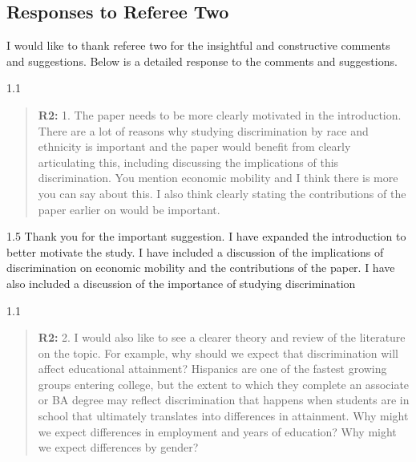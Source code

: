\documentclass[12pt,english]{article}
\newcommand{\rrquote}{1.1}
\newcommand{\rrxspc}{1.5}
\begin{document}
\begin{refsection}
\clearpage
\pagebreak

    \section{Responses to Referee Two}
    I would like to thank referee two for the insightful and constructive comments and suggestions. Below is a detailed response to the comments and suggestions.

    \begin{spacing}{\rrquote}
        \begin{quotation}
        \textbf{R2: } 1. The paper needs to be more clearly motivated in the introduction. There are a lot of reasons why studying discrimination by race and ethnicity is important and the paper would benefit from clearly articulating this, including discussing the implications of this discrimination. You mention economic mobility and I think there is more you can say about this. I also think clearly stating the contributions of the paper earlier on would be important.
        \end{quotation}
        \end{spacing}
        
        \begin{spacing}{\rrxspc}
            Thank you for the important suggestion. I have expanded the introduction to better motivate the study. I have included a discussion of the implications of discrimination on economic mobility and the contributions of the paper. I have also included a discussion of the importance of studying discrimination    
    \end{spacing}

    \begin{spacing}{\rrquote}
        \begin{quotation}
        \textbf{R2: } 2. I would also like to see a clearer theory and review of the literature on the topic. For example, why should we expect that discrimination will affect educational attainment? Hispanics are one of the fastest growing groups entering college, but the extent to which they complete an associate or BA degree may reflect discrimination that happens when students are in school that ultimately translates into differences in attainment. Why might we expect differences in employment and years of education?
        Why might we expect differences by gender?
        \end{quotation}
        \end{spacing}
        

\end{refsection}
\end{document}
